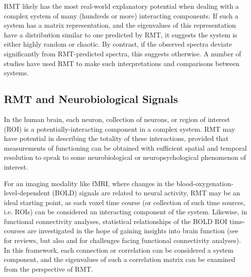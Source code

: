 \documentclass[12pt]{spieman}  %
\begin{document}
\begin{spacing}{2}
RMT likely has the most real-world explanatory potential when dealing with a
complex system of many (hundreds or more\cite{mehtaRandomMatrices2004})
interacting components. If such a system has a matrix representation, and the
eigenvalues of this representation have a distribution similar to one predicted
by RMT, it suggests the system is either highly random or chaotic. By contrast,
if the observed spectra deviate significantly from RMT-predicted spectra, this
suggests otherwise. A number of studies have used RMT to make such
interpretations and comparisons between
systems\cite{santhanamStatisticsAtmosphericCorrelations2001,
jalanUncoveringRandomnessSuccess2014,
bandyopadhyayUniversalityComplexNetworks2007,
agrawalQuantifyingRandomnessProtein2014, raiRandomnessPreservedPatterns2015,
sebaRandomMatrixAnalysis2003, wangSpectralPropertiesTemporal2015,
wangRandomMatrixTheory2016, matharooSpontaneousBackpainAlters2020}.

\subsection{RMT and Neurobiological Signals}

In the human brain, each neuron, collection of neurons, or region of interest
(ROI) is a potentially-interacting component in a complex system. RMT
may have potential in describing the totality of these interactions, provided
that measurements of functioning can be obtained with sufficient spatial and
temporal resolution to speak to some neurobiological or neuropsychological
phenomenon of interest.

For an imaging modality like fMRI, where changes in the
blood-oxygenation-level-dependent (BOLD) signals are related to neural
activity, RMT may be an ideal starting point, as each voxel time course (or
collection of such time sources, i.e. ROIs) can be considered an interacting
component of the system. Likewise, in functional connectivity
analyses, statistical relationships of the BOLD ROI time-courses are
investigated in the hope of gaining insights into brain function (see
 for reviews, but also
 and
 for challenges facing functional
connectivity analyses). In this framework, each connection or correlation can
be considered a system component, and the eigenvalues of such a correlation
matrix can be examined from the perspective of RMT.


\end{spacing}
\end{document}

